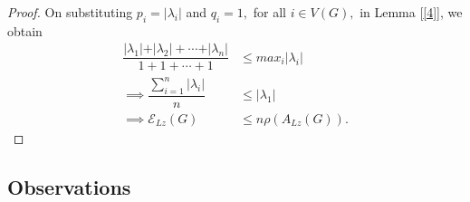 \documentclass[10pt,a4paper,oneside]{article}
\begin{document}
\begin{proof}
On substituting $p_i=\vert \lambda_i\vert$ and $q_i=1,$ for all $i\in V(G),$ in Lemma [\ref{4}], we obtain \begin{align*}
\dfrac{\vert \lambda_1\vert+\vert \lambda_2\vert+\cdots+\vert\lambda_n\vert}{1+1+\cdots+1}&\leq max_{i}\vert\lambda_i\vert\\\implies \dfrac{\sum\limits_{i=1}^{n}\vert\lambda_i\vert}{n}&\leq \vert \lambda_1\vert \\\implies \mathcal{E}_{Lz}(G)&\leq n\rho(A_{Lz}(G)).
\end{align*}
\end{proof}


\subsection{Observations}
\end{document}
